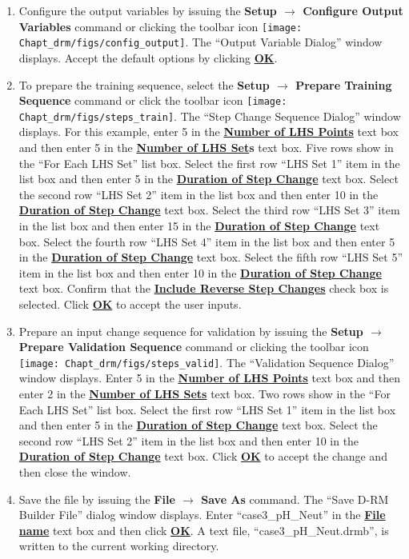 \begin{enumerate}
	\item Configure the output variables by issuing the \textbf{Setup $\rightarrow$ Configure Output Variables} command or clicking the toolbar icon \texttt{[image: Chapt\_drm/figs/config\_output]}.  The ``Output Variable Dialog'' window displays.  Accept the default options by clicking \textbf{\underline{OK}}.
	\item To prepare the training sequence, select the \textbf{Setup $\rightarrow$ Prepare Training Sequence} command or click the toolbar icon \texttt{[image: Chapt\_drm/figs/steps\_train]}.  The ``Step Change Sequence Dialog'' window displays.  For this example, enter 5 in the \textbf{\underline{Number of LHS Points}} text box and then enter 5 in the \textbf{\underline{Number of LHS Set}s} text box.  Five rows show in the ``For Each LHS Set'' list box.  Select the first row ``LHS Set 1'' item in the list box and then enter 5 in the \textbf{\underline{Duration of Step Change}} text box.  Select the second row ``LHS Set 2'' item in the list box and then enter 10 in the \textbf{\underline{Duration of Step Change}} text box.  Select the third row ``LHS Set 3'' item in the list box and then enter 15 in the \textbf{\underline{Duration of Step Change}} text box.  Select the fourth row ``LHS Set 4'' item in the list box and then enter 5 in the \textbf{\underline{Duration of Step Change}} text box.  Select the fifth row ``LHS Set 5'' item in the list box and then enter 10 in the \textbf{\underline{Duration of Step Change}} text box.  Confirm that the \textbf{\underline{Include Reverse Step Changes}} check box is selected.  Click \textbf{\underline{OK}} to accept the user inputs.
	\item Prepare an input change sequence for validation by issuing the \textbf{Setup $\rightarrow$ Prepare Validation Sequence} command or clicking the toolbar icon \texttt{[image: Chapt\_drm/figs/steps\_valid]}.  The ``Validation Sequence Dialog'' window displays.  Enter 5 in the \textbf{\underline{Number of LHS Points}} text box and then enter 2 in the \textbf{\underline{Number of LHS Sets}} text box.  Two rows show in the ``For Each LHS Set'' list box.  Select the first row ``LHS Set 1'' item in the list box and then enter 5 in the \textbf{\underline{Duration of Step Change}} text box.  Select the second row ``LHS Set 2'' item in the list box and then enter 10 in the \textbf{\underline{Duration of Step Change}} text box.  Click \textbf{\underline{OK}} to accept the change and then close the window.
	\item Save the file by issuing the \textbf{File $\rightarrow$ Save As} command.  The ``Save D-RM Builder File'' dialog window displays.  Enter ``case3\_pH\_Neut'' in the \textbf{\underline{File name}} text box and then click \textbf{\underline{OK}}.  A text file, ``case3\_pH\_Neut.drmb'', is written to the current working directory.

\end{enumerate}
